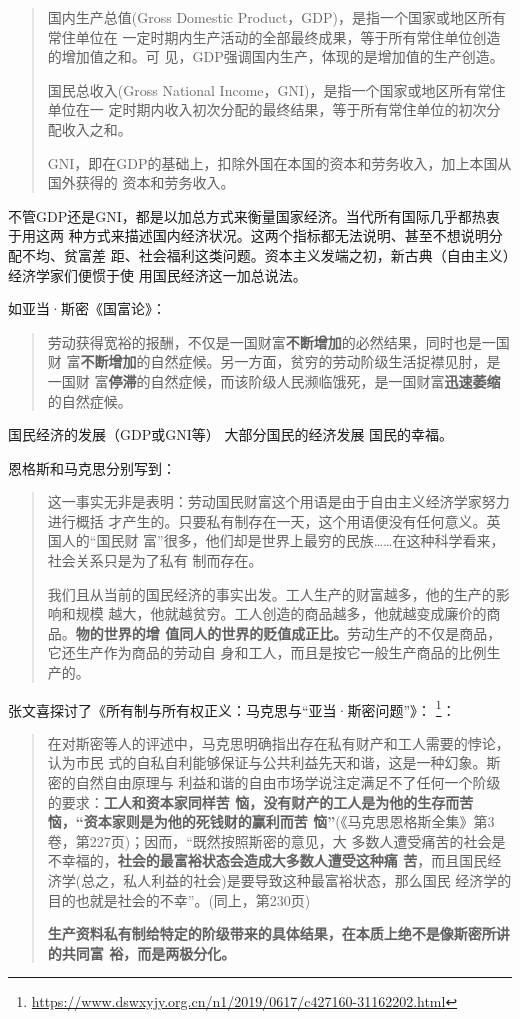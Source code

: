 \begin{quotation}
  国内生产总值(Gross Domestic Product，GDP)，是指一个国家或地区所有常住单位在
  一定时期内生产活动的全部最终成果，等于所有常住单位创造的增加值之和。可
  见，GDP强调国内生产，体现的是增加值的生产创造。


  国民总收入(Gross National Income，GNI)，是指一个国家或地区所有常住单位在一
  定时期内收入初次分配的最终结果，等于所有常住单位的初次分配收入之和。

  GNI，即在GDP的基础上，扣除外国在本国的资本和劳务收入，加上本国从国外获得的
  资本和劳务收入。
\end{quotation}

不管GDP还是GNI，都是以加总方式来衡量国家经济。当代所有国际几乎都热衷于用这两
种方式来描述国内经济状况。这两个指标都无法说明、甚至不想说明分配不均、贫富差
距、社会福利这类问题。资本主义发端之初，新古典（自由主义）经济学家们便惯于使
用国民经济这一加总说法。

如亚当·斯密《国富论》：
\begin{quotation}
  劳动获得宽裕的报酬，不仅是一国财富\textbf{不断增加}的必然结果，同时也是一国财
  富\textbf{不断增加}的自然症候。另一方面，贫穷的劳动阶级生活捉襟见肘，是一国财
  富\textbf{停滞}的自然症候，而该阶级人民濒临饿死，是一国财富\textbf{迅速萎缩}的自然症候。
\end{quotation}


国民经济的发展（GDP或GNI等） \neq 大部分国民的经济发展 \neq 国民的幸福。

恩格斯和马克思分别写到：
\begin{quotation}
  这一事实无非是表明：劳动国民财富这个用语是由于自由主义经济学家努力进行概括
  才产生的。只要私有制存在一天，这个用语便没有任何意义。英国人的“国民财
  富”很多，他们却是世界上最穷的民族……在这种科学看来，社会关系只是为了私有
  制而存在。


  我们且从当前的国民经济的事实出发。工人生产的财富越多，他的生产的影响和规模
  越大，他就越贫穷。工人创造的商品越多，他就越变成廉价的商品。\textbf{物的世界的增
    值同人的世界的贬值成正比。}劳动生产的不仅是商品，它还生产作为商品的劳动自
  身和工人，而且是按它一般生产商品的比例生产的。
\end{quotation}

张文喜探讨了《所有制与所有权正义：马克思与“亚当·斯密问题”》\cite{ZXYJ201404002}：
\footnote{\url{https://www.dswxyjy.org.cn/n1/2019/0617/c427160-31162202.html}}：
\begin{quotation}
  在对斯密等人的评述中，马克思明确指出存在私有财产和工人需要的悖论，认为市民
  式的自私自利能够保证与公共利益先天和谐，这是一种幻象。斯密的自然自由原理与
  利益和谐的自由市场学说注定满足不了任何一个阶级的要求：\textbf{工人和资本家同样苦
  恼，没有财产的工人是为他的生存而苦恼，“资本家则是为他的死钱财的赢利而苦
    恼”}(《马克思恩格斯全集》第3卷，第227页)；因而，“既然按照斯密的意见，大
  多数人遭受痛苦的社会是不幸福的，\textbf{社会的最富裕状态会造成大多数人遭受这种痛
    苦}，而且国民经济学(总之，私人利益的社会)是要导致这种最富裕状态，那么国民
  经济学的目的也就是社会的不幸”。(同上，第230页)

  \textbf{生产资料私有制给特定的阶级带来的具体结果，在本质上绝不是像斯密所讲的共同富
  裕，而是两极分化。}
\end{quotation}


